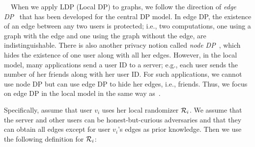 

{}~~When 
% 
we apply LDP (Local DP) to graphs, 
we follow the direction of \textit{edge DP}~\cite{Nissim_STOC07,Raskhodnikova_Encyclopedia16} that has been developed for the central DP model. 
In 
edge DP, 
the existence of an edge
between any two users is protected; i.e., two computations, one using a graph with the
edge and one using the graph without the edge, 
are indistinguishable. 
There is also another privacy notion called \textit{node DP}~\cite{Hay_ICDM09,Zhang_USENIX20}, which hides the existence of one user along with 
all her edges. 
However, in the local model, many applications send a user ID to a server; e.g., each user sends the number of her friends along with her user ID. 
For such applications, we cannot use node DP but can use edge DP to hide her edges, i.e., friends. 
Thus, we focus on edge DP in the local model in the same way as~\cite{Imola_USENIX21,qin2017generating,Sun_CCS19,Ye_ICDE20,Ye_TKDE21}. 

Specifically, 
assume that user $v_i$ uses her local randomizer $\mathcal{R}_i$. 
We assume that the server and other users can be 
honest-but-curious adversaries and that they can obtain all edges except for user $v_i$'s edges 
as prior knowledge. 
Then we 
use the following definition for $\mathcal{R}_i$:

